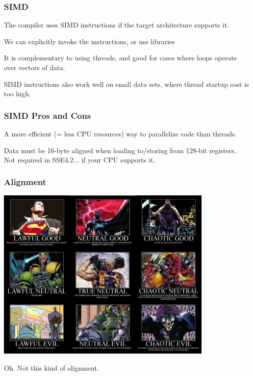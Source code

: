 \begin{frame}
\frametitle{SIMD}

The compiler uses SIMD instructions if the target architecture supports it.

We can explicitly invoke the instructions, or use libraries

It is complementary to using threads, and good for cases where loops operate over vectors of data.

SIMD instructions also work well on small data sets, where thread startup
cost is too high.

\end{frame}


\begin{frame}
  \frametitle{SIMD Pros and Cons}

A more efficient (= less CPU resources) way to parallelize code than threads.

Data must be 16-byte aligned when loading to/storing from 128-bit registers.\\
\quad Not required in SSE4.2... if your CPU supports it.
  

\end{frame}


\begin{frame}
\frametitle{Alignment}

\begin{center}
	\includegraphics[width=0.8\textwidth]{images/superhero-alignment.png}
\end{center}

Oh. Not this kind of alignment.

\end{frame}




